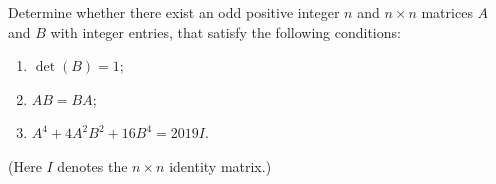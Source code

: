 \documentclass{article}
\begin{document}
\setlength{\parindent}{0pt}
Determine whether there exist an odd positive integer \(\displaystyle n\) and \(\displaystyle n\times n\) matrices \(\displaystyle A\) and \(\displaystyle B\) with integer entries, that satisfy the following conditions:
\begin{enumerate}[label=(\arabic*)]
\item $\det(B)=1$;
\item $AB=BA$;
\item $A^4+4A^2B^2+16B^4=2019I$.
\end{enumerate}
(Here \(\displaystyle I\) denotes the \(\displaystyle n\times n\) identity matrix.)
\end{document}
